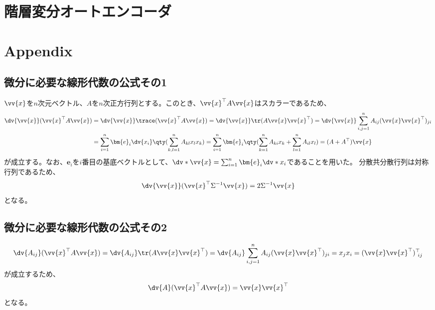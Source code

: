 \documentclass[a4paper,11pt,uplatex]{jsarticle}%
\begin{document}
\section{階層変分オートエンコーダ}

\section{Appendix}

\subsection{微分に必要な線形代数の公式その1}
$\vv{x}$を$n$次元ベクトル、$A$を$n$次正方行列とする。このとき、$\vv{x}^{\top}A\vv{x}$はスカラーであるため、
\begin{align}
  \dv{\vv{x}}(\vv{x}^{\top}A\vv{x}) & = \dv{\vv{x}}\trace(\vv{x}^{\top}A\vv{x}) = \dv{\vv{x}}\tr(A\vv{x}\vv{x}^{\top})
  = \dv{\vv{x}}\sum_{i,j=1}^{n}A_{ij}(\vv{x}\vv{x}^{\top})_{ji} \notag                                                 \\
                                    & = \sum_{i=1}^{n}\bm{e}_{i}\dv{x_i}\qty(\sum_{k,l=1}^{n}A_{kl}x_lx_k)
  = \sum_{i=1}^{n}\bm{e}_{i}\qty(\sum_{k=1}^{n}A_{ki}x_k + \sum_{l=1}^{n}A_{il}x_l) = (A+A^{\top})\vv{x}
\end{align}
が成立する。なお、$\bm{e}_i$を$i$番目の基底ベクトルとして、$\dv*{\vv{x}} = \sum_{i=1}^{n}\bm{e}_i\dv*{x_i}$であることを用いた。
分散共分散行列は対称行列であるため、
\begin{equation}
  \dv{\vv{x}}(\vv{x}^{\top}\Sigma^{-1}\vv{x}) = 2\Sigma^{-1}\vv{x}
\end{equation}
となる。
\subsection{微分に必要な線形代数の公式その2}
\begin{equation}
  \dv{A_{ij}}(\vv{x}^{\top}A\vv{x})  = \dv{A_{ij}}\tr(A\vv{x}\vv{x}^{\top})
  = \dv{A_{ij}}\sum_{i,j=1}^{n}A_{ij}(\vv{x}\vv{x}^{\top})_{ji} = x_jx_i = (\vv{x}\vv{x}^{\top})^{\top}_{~ij}
\end{equation}
が成立するため、
\begin{equation}
  \dv{A}(\vv{x}^{\top}A\vv{x})  = \vv{x}\vv{x}^{\top}
\end{equation}
となる。
\end{document}
